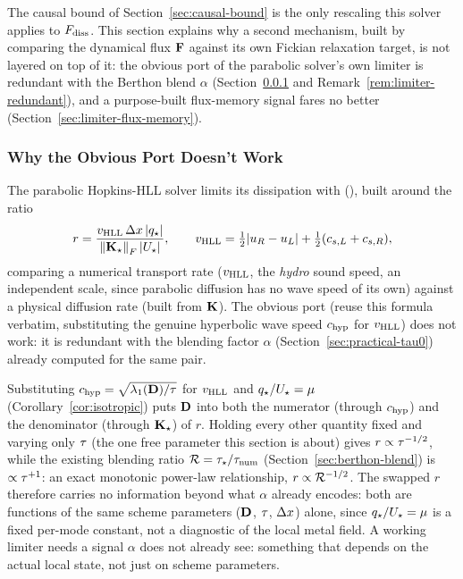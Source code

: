 The causal bound of Section~\ref{sec:causal-bound} is the only rescaling
this solver applies to $F_{\rm diss}$. This section explains why a second
mechanism, built by comparing the dynamical flux $\mathbf{F}$ against its own
Fickian relaxation target, is not layered on top of it: the obvious port
of the parabolic solver's own limiter is redundant with the Berthon blend
$\alpha$ (Section~\ref{sec:limiter-naive-port} and
Remark~\ref{rem:limiter-redundant}), and a purpose-built flux-memory
signal fares no better (Section~\ref{sec:limiter-flux-memory}).

\subsubsection{Why the Obvious Port Doesn't Work}
\label{sec:limiter-naive-port}
The parabolic Hopkins-HLL solver limits its dissipation with
 (),
built around the ratio
\begin{equation}
  r = \frac{v_{\rm HLL}\,\Delta x\,\lvert q_\star\rvert}{\norm{\mathbf{K}_\star}_F\,\lvert U_\star\rvert} ,
  \qquad v_{\rm HLL} = \tfrac12\lvert u_R-u_L\rvert + \tfrac12(c_{s,L}+c_{s,R}) ,
\end{equation}
comparing a numerical transport rate ($v_{\rm HLL}$, the \emph{hydro}
sound speed, an independent scale, since parabolic diffusion has no
wave speed of its own) against a physical diffusion rate (built from
$\mathbf{K}$). The obvious port (reuse this formula verbatim, substituting
the genuine hyperbolic wave speed $c_{\rm hyp}$ for $v_{\rm HLL}$) does not
work: it is redundant with the blending factor $\alpha$
(Section~\ref{sec:practical-tau0}) already computed for the same pair.

\begin{remark}
\label{rem:limiter-redundant}
Substituting $c_{\rm hyp}=\sqrt{\lambda_1(\mathbf{D})/\tau}$ for $v_{\rm HLL}$
and $q_\star/U_\star=\mu$ (Corollary~\ref{cor:isotropic}) puts
$\mathbf{D}$ into both the numerator (through $c_{\rm hyp}$) and the denominator
(through $\mathbf{K}_\star$) of $r$. Holding every other quantity fixed and
varying only $\tau$ (the one free parameter this section is about)
gives $r\propto\tau^{-1/2}$, while the existing blending ratio
$\mathcal{R}=\tau_\star/\tau_{\rm num}$
(Section~\ref{sec:berthon-blend}) is $\propto\tau^{+1}$: an exact
monotonic power-law relationship, $r\propto\mathcal{R}^{-1/2}$. The swapped $r$ therefore
carries no information beyond what $\alpha$ already encodes: both are
functions of the same scheme parameters ($\mathbf{D}$, $\tau$, $\Delta x$)
alone, since $q_\star/U_\star=\mu$ is a fixed per-mode constant,
not a diagnostic of the local metal field. A working limiter needs a
signal $\alpha$ does not already see: something that depends on the
actual local state, not just on scheme parameters.
\end{remark}

